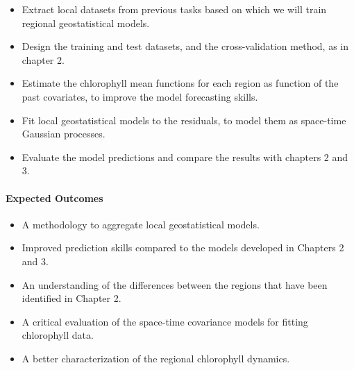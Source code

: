 \begin{itemize}

\item Extract local datasets from previous tasks based on which we will train
regional geostatistical models.

\item Design the training and test datasets, and the cross-validation method,
as in chapter 2.

\item Estimate the chlorophyll mean functions for each region as function of
the past covariates, to improve the model forecasting skills.

\item Fit local geostatistical models to the residuals, to model them as
space-time Gaussian processes.

\item Evaluate the model predictions and compare the results with chapters 2
and 3.

\end{itemize}

\paragraph{Expected Outcomes}

\begin{itemize}

\item A methodology to aggregate local geostatistical models.

\item Improved prediction skills compared to the models developed in Chapters 2
and 3.

\item An understanding of the differences between the regions that have been
identified in Chapter 2.

\item A critical evaluation of the space-time covariance models for fitting
chlorophyll data.

\item A better characterization of the regional chlorophyll dynamics.

\end{itemize}
